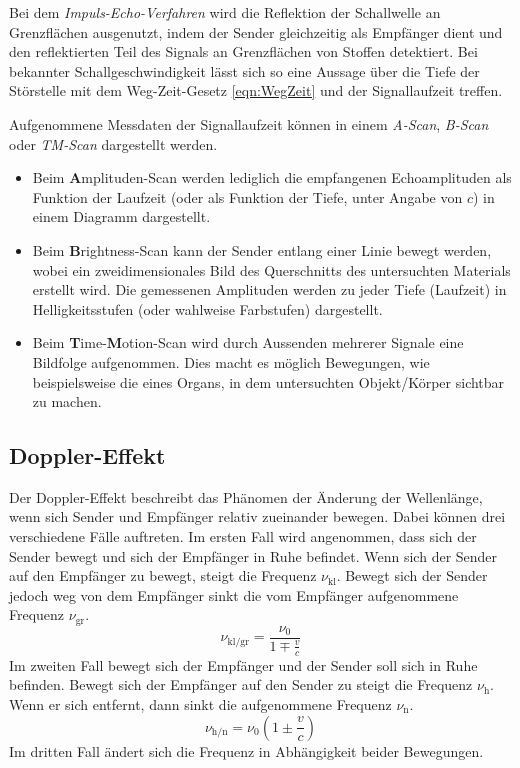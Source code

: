 Bei dem \textit{Impuls-Echo-Verfahren} wird die Reflektion der Schallwelle an Grenzflächen ausgenutzt, indem der Sender gleichzeitig als Empfänger dient und den 
reflektierten Teil des Signals an Grenzflächen von Stoffen detektiert. Bei bekannter Schallgeschwindigkeit lässt sich so eine Aussage über die Tiefe der Störstelle 
mit dem Weg-Zeit-Gesetz \eqref{eqn:WegZeit} und der Signallaufzeit treffen.

Aufgenommene Messdaten der Signallaufzeit können in einem \textit{A-Scan}, \textit{B-Scan} oder \textit{TM-Scan} dargestellt werden.
\begin{itemize}
    \item{Beim \textbf{A}mplituden-Scan werden lediglich die empfangenen Echoamplituden als Funktion der Laufzeit (oder als Funktion der Tiefe, unter Angabe von $c$)
    in einem Diagramm dargestellt.}
    \item{Beim \textbf{B}rightness-Scan kann der Sender entlang einer Linie bewegt werden, wobei ein zweidimensionales Bild des Querschnitts des untersuchten Materials
    erstellt wird. Die gemessenen Amplituden werden zu jeder Tiefe (Laufzeit) in Helligkeitsstufen (oder wahlweise Farbstufen) dargestellt.}
    \item{Beim \textbf{T}ime-\textbf{M}otion-Scan wird durch Aussenden mehrerer Signale eine Bildfolge aufgenommen. Dies macht es möglich Bewegungen, wie beispielsweise 
    die eines Organs, in dem untersuchten Objekt/Körper sichtbar zu machen.}
\end{itemize}
\subsection{Doppler-Effekt}
\label{subsec:doppler}
Der Doppler-Effekt beschreibt das Phänomen der Änderung der Wellenlänge, wenn sich Sender und Empfänger relativ zueinander bewegen. Dabei können drei verschiedene Fälle auftreten.
Im ersten Fall wird angenommen, dass sich der Sender bewegt und sich der Empfänger in Ruhe befindet. Wenn sich der Sender auf den Empfänger zu bewegt, steigt die Frequenz $\nu_{\text{kl}}$. Bewegt 
sich der Sender jedoch weg von dem Empfänger sinkt die vom Empfänger aufgenommene Frequenz $\nu_{\text{gr}}$.
\begin{equation*}
    \nu_{\text{kl/gr}} = \frac{\nu_0}{1 \mp \frac{v}{c}} 
\end{equation*}
Im zweiten Fall bewegt sich der Empfänger und der Sender soll sich in Ruhe befinden. Bewegt sich der Empfänger auf den Sender zu steigt die Frequenz $\nu_{\text{h}}$.
Wenn er sich entfernt, dann sinkt die aufgenommene Frequenz $\nu_{\text{n}}$. 
\begin{equation*}
    \nu_{\text{h/n}} = \nu_0 \left(1 \pm \frac{v}{c}\right)
\end{equation*}
Im dritten Fall ändert sich die Frequenz in Abhängigkeit beider Bewegungen.
